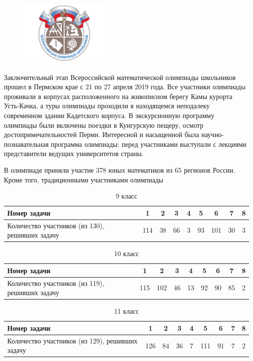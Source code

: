 \begin{multicols}{2}
	\begin{figure}[H]
		\includegraphics[width=0.4\textwidth]{pic4}
		\centering
	\end{figure}
Заключительный этап Всероссийской математической олимпиады школьников прошел в
Пермском крае с 21 по 27 апреля 2019 года. Все
участники олимпиады проживали в корпусах
расположенного на живописном берегу Камы
курорта Усть-Качка, а туры олимпиады проходили в находящемся неподалеку современном
здании Кадетского корпуса. В экскурсионную
программу олимпиады были включены поездки в Кунгурскую пещеру, осмотр достопримечательностей Перми. Интересной и насыщенной была научно-познавательная программа
олимпиады: перед участниками выступали с
лекциями представители ведущих университетов страны.

В олимпиаде приняли участие 378 юных
математиков из 65 регионов России. Кроме
того, традиционными участниками олимпиады
\vspace{-2em}
\begin{table}[H]
	\centering
	\caption{9 класс}
	\begin{tabular}{|M{17mm}|c|c|c|c|c|c|c|c|}
		\hline
		Номер задачи & 1 & 2 & 3 & 4 & 5 & 6 & 7 & 8 \\	
		\hline
		Количество участников (из 130), решивших задачу & 114
		& 38 & 66 & 3 & 93 & 101 & 30 & 3 \\
		\hline
	\end{tabular}
\end{table}
\vspace{-2em}
\begin{table}[H]
	\centering
	\caption{10 класс}
	\begin{tabular}{|M{17mm}|c|c|c|c|c|c|c|c|}
		\hline
		Номер задачи & 1 & 2 & 3 & 4 & 5 & 6 & 7 & 8 \\	
		\hline
		Количество участников (из 119), решивших задачу & 115
		& 102 & 46 & 13 & 92 & 90 & 85 & 2 \\
		\hline
	\end{tabular}
\end{table}
\vspace{-2em}
\begin{table}[H]
	\centering
	\caption{11 класс}
	\begin{tabular}{|M{17mm}|c|c|c|c|c|c|c|c|}
		\hline
		Номер задачи & 1 & 2 & 3 & 4 & 5 & 6 & 7 & 8 \\	
		\hline
		Количество участников (из 129), решивших задачу & 126
		& 84 & 36 & 7 & 111 & 91 & 7 & 2 \\
		\hline
	\end{tabular}
\end{table}

\end{multicols}
